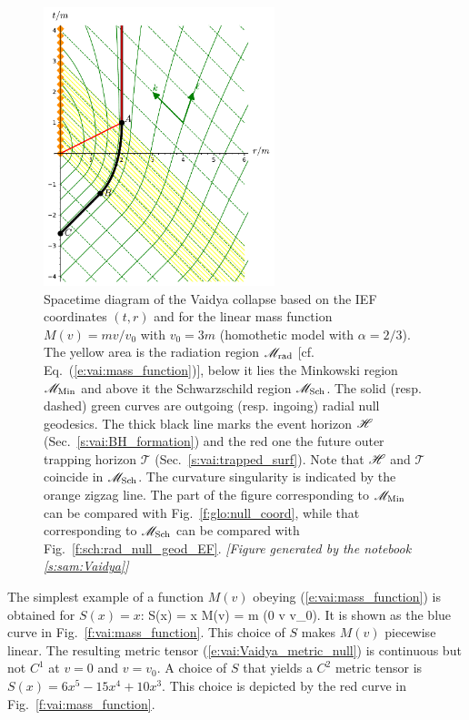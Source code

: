 \begin{figure}
\centerline{\includegraphics[width=0.6\textwidth]{vai_diag_S0.pdf}}
\caption[]{\label{f:vai:diag_S0} \footnotesize
Spacetime diagram of the Vaidya collapse based on the IEF coordinates $(t, r)$
and for the linear mass function $M(v)=m v/v_0$ with $v_0 = 3 m$
(homothetic model with $\alpha = 2/3$).
The yellow area is the radiation region $\mathscr{M}_{\rm rad}$
[cf. Eq.~(\ref{e:vai:mass_function})],
below it lies the Minkowski region $\mathscr{M}_{\rm Min}$
and above it the Schwarzschild region $\mathscr{M}_{\rm Sch}$.
The solid (resp. dashed) green curves are outgoing (resp. ingoing) radial
null geodesics. The thick black line marks the event horizon $\mathscr{H}$ (Sec.~\ref{s:vai:BH_formation}) and
the red one the future outer trapping horizon $\mathscr{T}$ (Sec.~\ref{s:vai:trapped_surf}).
Note that $\mathscr{H}$ and $\mathscr{T}$ coincide in $\mathscr{M}_{\rm Sch}$.
The curvature singularity
is indicated by the orange zigzag line. The part of the figure corresponding
to $\mathscr{M}_{\rm Min}$ can be compared with Fig.~\ref{f:glo:null_coord},
while that corresponding to $\mathscr{M}_{\rm Sch}$ can be
compared with Fig.~\ref{f:sch:rad_null_geod_EF}.
\textsl{[Figure generated by the notebook \ref{s:sam:Vaidya}]}
}
\end{figure}


The simplest example of a function $M(v)$
obeying (\ref{e:vai:mass_function}) is obtained for $S(x) = x$:
\be \label{e:vai:S_linear}
     S(x) = x \quad \iff \quad M(v) = m  \quad (0 \leq v \leq v_0).
\ee
It is shown as the blue curve in Fig.~\ref{f:vai:mass_function}.
This choice of $S$ makes $M(v)$ piecewise linear. The resulting metric tensor
(\ref{e:vai:Vaidya_metric_null}) is continuous but not $C^1$ at $v=0$ and $v=v_0$. A choice
of $S$ that yields a $C^2$ metric tensor is $S(x) = 6 x^5 - 15 x^4 + 10 x^3$.
This choice is depicted by the red curve in Fig.~\ref{f:vai:mass_function}.

